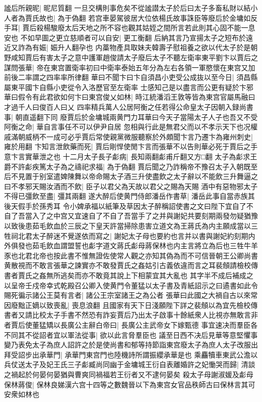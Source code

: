 謐后所親昵|{
	昵尼質翻}
一旦交構則事危矣不從謐譛太子於后曰太子多畜私財以結小人者為賈氏故也|{
	為于偽翻}
若宫車晏駕彼居大位依楊氏故事誅臣等廢后於金墉如反手耳|{
	賈后殺楊駿廢太后天地之所不容也觀其姑姪之間所言若此則其心固不能一息安也}
不如早圖之更立慈順者可以自安|{
	更工衡翻}
后納其言乃宣揚太子之短布於遠近又詐為有娠|{
	娠升人翻孕也}
内藁物產具取妹夫韓壽子慰祖養之欲以代太子於是朝野咸知賈后有害太子之意中護軍趙俊請太子廢后太子不聽左衛率東平劉卞以賈后之謀問張華|{
	帝在東宫置衛率初曰中衛率泰始五年分為左右各領一軍愍懷在東宫又加前後二率謂之四率率所律翻}
華曰不聞卞曰卞自須昌小吏受公成抜以至今日|{
	須昌縣屬東平國卞自縣小吏從令入洛歷官至左衛率}
士感知己是以盡言而公更有疑於卞邪華曰假令有此君欲如何卞曰東宫俊乂如林|{
	時江統潘滔王敦等皆為東宫官屬馬融曰才過千人曰俊百人曰乂}
四率精兵萬人公居阿衡之任若得公命皇太子因朝入録尚書事|{
	朝直遥翻下同}
廢賈后於金墉城兩黄門力耳華曰今天子當陽太子人子也吾又不受阿衡之命|{
	華自言事任不可以伊尹自居}
忽相與行此是無君父而以不孝示天下也况權戚滿朝威柄不一成可必乎賈后常使親黨微服聽察於外頗聞卞言乃遷卞為雍州刺史|{
	雍於用翻}
卞知言泄飲藥而死|{
	賈后剛悍使閒卞言而張華不以告則華必死于賈后之手意卞言實華泄之也}
十二月太子長子虨病|{
	長知兩翻虨甫斤翻又方□翻}
太子為虨求王爵不許虨疾篤太子為之禱祀求福|{
	為于偽翻}
賈后聞之乃詐稱帝不豫召太子入朝既至后不見置于别室遣婢陳舞以帝命賜太子酒三升使盡飲之太子辭以不能飲三升舞逼之曰不孝邪天賜汝酒而不飲|{
	臣子以君父為天故以君父之賜為天賜}
酒中有惡物邪太子不得已彊飲至盡|{
	彊其兩翻}
遂大醉后使黄門侍郎潘岳作書草|{
	潘岳此事自當赤族其後天假手於孫秀耳}
令小婢承福以紙筆及草因太子醉稱詔使書之文曰陛下宜自了不自了吾當入了之中宫又宜速自了不自了吾當手了之并與謝妃共要刻期兩發勿疑猶豫以致後患茹毛飲血於三辰之下皇天許當掃除患害立道文為王蔣氏為内主願成當以三牲祠北君太子醉迷不覺遂依而寫之|{
	謝妃太子母也要約也言并以書與謝妃約刻期内外俱發也茹毛飲血謂盟誓也虨字道文蔣氏虨母蔣保林也内主言將立為后也三牲牛羊豕也北君北帝也按此書不惟無證佐使常人觀之亦知其偽為而不可信晉朝王公卿尚書黄散視而不敢言張華之諫實亦不敢發賈氏之姦姑引古義依違而言之耳裴頠請檢校傳書者賈氏之姦無所逃矣而亦不敢竟其說上下相蒙宜其大亂也}
其字半不成后補成之以呈帝壬戍帝幸式乾殿召公卿入使黄門令董猛以太子書及青紙詔示之曰遹書如此令賜死徧示諸公王莫有言者|{
	諸公王宗室諸王之為公者}
張華曰此國之大禍自古以來常因廢黜正嫡以致喪亂|{
	喪息浪翻}
且國家有天下日淺願陛下詳之裴頠以為宜先檢校傳書者又請比校太子手書不然恐有詐妄賈后乃出太子啟事十餘紙衆人比視亦無敢言非者賈后使董猛矯以長廣公主辭白帝曰|{
	長廣公主武帝女下嫁甄德}
事宜速决而羣臣各不同其不從詔者宜以軍法從事|{
	欲以此言脅羣臣也}
議至日西不决后見華等意堅懼事變乃表免太子為庶人詔許之於是使尚書和郁等持節詣東宫廢太子為庶人太子改服出拜受詔步出承華門|{
	承華門東宫門也陸機詩所謂振纓承華是也}
乘麤犢車東武公澹以兵仗送太子及妃王氏三子虨臧尚同幽于金墉城王衍自表離婚許之妃慟哭而歸|{
	清談之禍起於何晏何晏猶與曹爽同禍福若王衍者又不逮何晏矣}
殺太子母謝淑媛及虨母保林蔣俊|{
	保林良娣漢六宫十四等之數魏晉以下為東宫女官品秩師古曰保林言其可安衆如林也}


